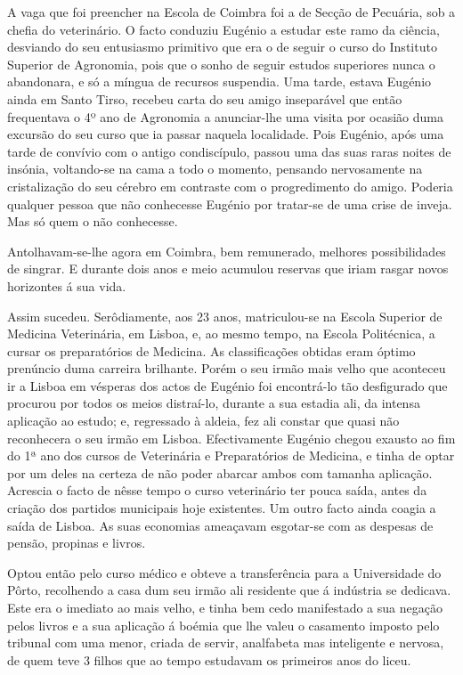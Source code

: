 \documentclass[9pt]{article}
\begin{document}
A vaga que foi preencher na Escola de Coimbra foi a de Sec\-ção de
Pecuária, sob a chefia do veterinário. O facto conduziu Eugé\-nio a estudar este ramo da ciência, desviando do seu entusiasmo primitivo que era
o de seguir o curso do Instituto Superior de Agronomia, pois que o sonho
de seguir estudos superiores nunca o abandonara, e só a míngua de recursos suspendia. Uma tarde, estava Eugé\-nio ainda em Santo Tirso, recebeu
carta do seu amigo inseparável que então frequentava o 4º ano de Agronomia a anunciar-\-lhe uma visita por ocasião duma excursão do seu curso que
ia passar naquela localidade. Pois Eugé\-nio, após uma tarde de con\-ví\-vio
com o antigo condiscípulo, passou uma das suas raras noites de insónia,
voltando-se na cama a todo o momento, pensando nervosamente na cristaliza\-ção do seu cérebro em contraste com o progredimento do amigo. Poderia
qualquer pessoa que não conhecesse Eugé\-nio por tratar-se de uma crise
de inveja. Mas só quem o não conhecesse.

Anto\-lhavam-se-\-lhe agora em Coimbra, bem remunerado, me\-lhores possibilidades de singrar. E durante dois anos e meio acumulou reservas que
iriam rasgar novos horizontes á sua vida.

Assim sucedeu. Serôdiamente, aos 23 anos, matriculou-se na Escola Superior de Medicina Veterinária, em Lisboa, e, ao mesmo tempo, na Escola Politécnica, a cursar os preparatórios de Medicina. As classifi\-ca\-ções obtidas eram óptimo prenúncio duma carreira bri\-lhante. Porém o seu irmão
mais ve\-lho que aconteceu ir a Lisboa em vésperas dos actos de Eugé\-nio
foi encontrá-lo tão desfigurado que procurou por todos os meios distraí-lo, durante a sua estadia ali, da intensa aplica\-ção ao estudo; e,
regressado à aldeia, fez ali constar que quasi não reconhecera o seu irmão em Lisboa. Efectivamente
Eugé\-nio chegou exausto ao fim do 1ª ano dos cursos de Veterinária e Preparatórios de Medicina, e tinha de optar por um deles na certeza de não
poder abarcar ambos com tamanha aplica\-ção. Acrescia o facto de nêsse tempo o curso veterinário ter pouca saída, antes da cria\-ção dos partidos
municipais hoje existentes. Um outro facto ainda coagia a saída de Lisboa.
As suas economias ameaçavam esgotar-se com as despesas de pensão, propinas
e livros.

Optou então pelo curso médico e obteve a transferência para a Universidade do Pôrto, reco\-lhendo a casa dum seu irmão ali residente que á
indústria se dedicava. Este era o imediato ao mais ve\-lho, e tinha bem cedo
manifestado a sua nega\-ção pelos livros e a sua aplica\-ção á boémia que
\-lhe valeu o casamento imposto pelo tribunal com uma menor, criada de servir, analfabeta mas inteligente e nervosa, de quem teve 3 fi\-lhos que ao
tempo estudavam os primeiros anos do liceu.
\end{document}
